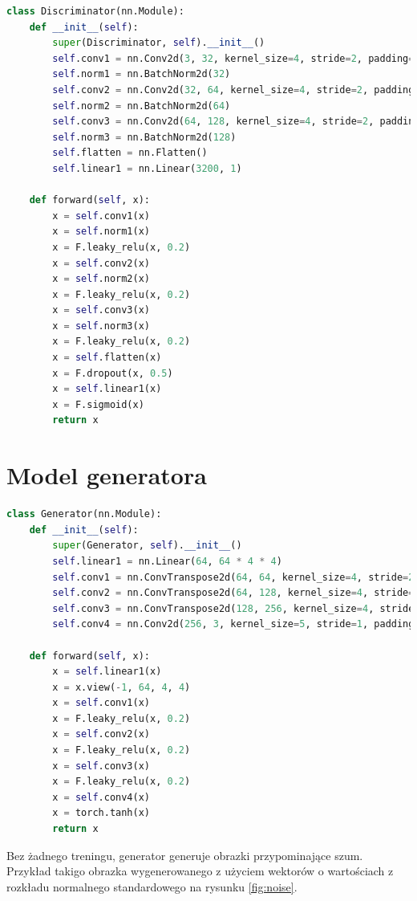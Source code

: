 \documentclass[a4paper]{article}
\begin{document}
\begin{lstlisting}[language=python]
class Discriminator(nn.Module):
    def __init__(self):
        super(Discriminator, self).__init__()
        self.conv1 = nn.Conv2d(3, 32, kernel_size=4, stride=2, padding=2)
        self.norm1 = nn.BatchNorm2d(32)
        self.conv2 = nn.Conv2d(32, 64, kernel_size=4, stride=2, padding=2)
        self.norm2 = nn.BatchNorm2d(64)
        self.conv3 = nn.Conv2d(64, 128, kernel_size=4, stride=2, padding=2)
        self.norm3 = nn.BatchNorm2d(128)
        self.flatten = nn.Flatten()
        self.linear1 = nn.Linear(3200, 1)

    def forward(self, x):
        x = self.conv1(x)
        x = self.norm1(x)
        x = F.leaky_relu(x, 0.2)
        x = self.conv2(x)
        x = self.norm2(x)
        x = F.leaky_relu(x, 0.2)
        x = self.conv3(x)
        x = self.norm3(x)
        x = F.leaky_relu(x, 0.2)
        x = self.flatten(x)
        x = F.dropout(x, 0.5)
        x = self.linear1(x)
        x = F.sigmoid(x)
        return x
\end{lstlisting}

\section{Model generatora}

\begin{lstlisting}[language=python]
class Generator(nn.Module):
    def __init__(self):
        super(Generator, self).__init__()
        self.linear1 = nn.Linear(64, 64 * 4 * 4)
        self.conv1 = nn.ConvTranspose2d(64, 64, kernel_size=4, stride=2, padding=1)
        self.conv2 = nn.ConvTranspose2d(64, 128, kernel_size=4, stride=2, padding=1)
        self.conv3 = nn.ConvTranspose2d(128, 256, kernel_size=4, stride=2, padding=1)
        self.conv4 = nn.Conv2d(256, 3, kernel_size=5, stride=1, padding=2)

    def forward(self, x):
        x = self.linear1(x)
        x = x.view(-1, 64, 4, 4)
        x = self.conv1(x)
        x = F.leaky_relu(x, 0.2)
        x = self.conv2(x)
        x = F.leaky_relu(x, 0.2)
        x = self.conv3(x)
        x = F.leaky_relu(x, 0.2)
        x = self.conv4(x)
        x = torch.tanh(x)
        return x
\end{lstlisting}

Bez żadnego treningu, generator generuje obrazki przypominające szum. Przykład takigo obrazka wygenerowanego
z użyciem wektorów o wartościach z rozkładu normalnego standardowego na rysunku \ref{fig:noise}.
\end{document}
